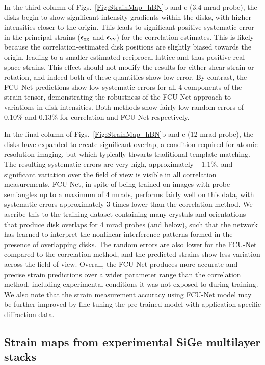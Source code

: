 \documentclass[%
 reprint,
superscriptaddress,
 amsmath,
 amssymb,
 prl,
]{revtex4-2}
\begin{document}
In the third column of Figs.~\ref{Fig:StrainMap_hBN}b and c (3.4 mrad probe), the disks begin to show significant intensity gradients within the disks, with higher intensities closer to the origin. This leads to significant positive systematic error in the principal strains ($\epsilon_{\rm{xx}}$ and $\epsilon_{\rm{yy}}$) for the correlation estimates. This is likely because the correlation-estimated disk positions are slightly biased towards the origin, leading to a smaller estimated reciprocal lattice and thus positive real space strains. This effect should not modify the results for either shear strain or rotation, and indeed both of these quantities show low error. By contrast, the FCU-Net predictions show low systematic errors for all 4 components of the strain tensor, demonstrating the robustness of the FCU-Net approach to variations in disk intensities. Both methods show fairly low random errors of $0.10\%$ and $0.13\%$ for correlation and FCU-Net respectively.

In the final column of Figs.~\ref{Fig:StrainMap_hBN}b and c (12 mrad probe), the disks have expanded to create significant overlap, a condition required for atomic resolution imaging, but which typically thwarts traditional template matching.  The resulting systematic errors are very high, approximately $-1.1\%$, and significant variation over the field of view is visible in all correlation measurements. FCU-Net, in spite of being trained on images with probe semiangles up to a maximum of 4 mrads, performs fairly well on this data, with systematic errors approximately 3 times lower than the correlation method. We ascribe this to the training dataset containing many crystals and orientations that produce disk overlaps for 4 mrad probes (and below), such that the network has learned to interpret the nonlinear interference patterns formed in the presence of overlapping disks. The random errors are also lower for the FCU-Net compared to the correlation method, and the predicted strains show less variation across the field of view. Overall, the FCU-Net produces more accurate and precise strain predictions over a wider parameter range than the correlation method, including experimental conditions it was not exposed to during training. We also note that the strain measurement accuracy using FCU-Net model may be further improved by fine tuning the pre-trained model with application specific diffraction data.  

\subsection*{Strain maps from experimental SiGe multilayer stacks}
\end{document}
